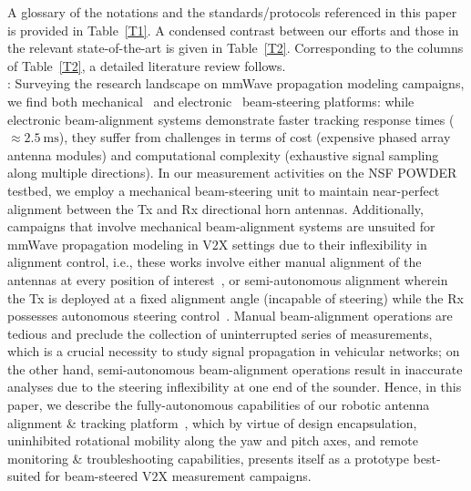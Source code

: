 \documentclass[10pt, twocolumn]{IEEEtran}
\begin{document}
A glossary of the notations and the standards/protocols referenced in this paper is provided in Table~\ref{T1}. A condensed contrast between our efforts and those in the relevant state-of-the-art is given in Table~\ref{T2}. Corresponding to the columns of Table~\ref{T2}, a detailed literature review follows.\\
: Surveying the research landscape on mmWave propagation modeling campaigns, we find both mechanical~\cite{Purdue, Foliage, Harvard, SpatialConsistencyOriginal, SpatialDynamics, SuburbanGeometryJournal, FoliageSimulations, QDC_NIST, D2DHumanBlockage, V2XBlockages, MacCartneyUrbanHumanBlockage} and electronic~\cite{AgileLink, Outdoor28G, DigitalDivide} beam-steering platforms: while electronic beam-alignment systems demonstrate faster tracking response times (${\approx}\SI{2.5}{\milli\second}$), they suffer from challenges in terms of cost (expensive phased array antenna modules) and computational complexity (exhaustive signal sampling along multiple directions). In our measurement activities on the NSF POWDER testbed, we employ a mechanical beam-steering unit to maintain near-perfect alignment between the Tx and Rx directional horn antennas. Additionally, campaigns that involve mechanical beam-alignment systems are unsuited for mmWave propagation modeling in V$2$X settings due to their inflexibility in alignment control, i.e., these works involve either manual alignment of the antennas at every position of interest~\cite{Purdue, Harvard, SpatialConsistencyOriginal, SpatialDynamics, SuburbanGeometryJournal, QDC_NIST, D2DHumanBlockage, MacCartneyUrbanHumanBlockage}, or semi-autonomous alignment wherein the Tx is deployed at a fixed alignment angle (incapable of steering) while the Rx possesses autonomous steering control~\cite{Foliage, FoliageSimulations, PDAPs, V2XBlockages}. Manual beam-alignment operations are tedious and preclude the collection of uninterrupted series of measurements, which is a crucial necessity to study signal propagation in vehicular networks; on the other hand, semi-autonomous beam-alignment operations result in inaccurate analyses due to the steering inflexibility at one end of the sounder. Hence, in this paper, we describe the fully-autonomous capabilities of our robotic antenna alignment \& tracking platform~\cite{SPAVE_ICC}, which by virtue of design encapsulation, uninhibited rotational mobility along the yaw and pitch axes, and remote monitoring \& troubleshooting capabilities, presents itself as a prototype best-suited for beam-steered V$2$X measurement campaigns.
\end{document}
